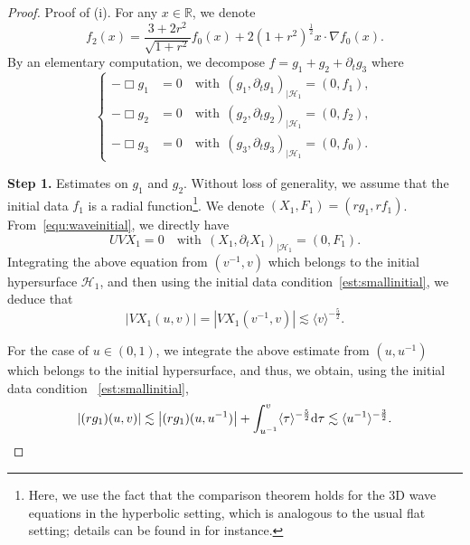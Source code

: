 \documentclass[a4paper,reqno]{amsart}
\theoremstyle{definition}
\numberwithin{equation}{section}
\def \R {{\mathbb{R} }}
\def \d {{\rm{d}}}
\def \pt{\partial_{t}}
\begin{document}
 \begin{proof}
 Proof of (i).
 For any $x\in \R$, we denote 
 \begin{equation*}
     f_{2}(x)=\frac{3+2r^{2}}{\sqrt{1+r^{2}}}f_{0}(x)+2(1+r^{2})^{\frac{1}{2}}x\cdot \nabla f_{0}(x).
 \end{equation*}
  By an elementary computation, we decompose $f=g_{1}+g_{2}+\pt g_{3}$ where
  \begin{equation*}
  \left\{
  \begin{aligned}
      -\Box g_{1}&=0\quad \mbox{with}\ \  (g_{1},\pt g_{1})_{|\mathcal{H}_{1}}=(0,f_{1}),\\
       -\Box g_{2}&=0\quad \mbox{with}\ \  (g_{2},\pt g_{2})_{|\mathcal{H}_{1}}=(0,f_{2}),\\
        -\Box g_{3}&=0\quad \mbox{with}\ \  (g_{3},\pt g_{3})_{|\mathcal{H}_{1}}=(0,f_{0}).
      \end{aligned}
      \right.
  \end{equation*}

  \textbf{Step 1.} Estimates on $g_{1}$ and $g_{2}$.
  Without loss of generality, we assume that the initial data $f_{1}$ is a radial function\footnote{Here, we use the fact that the comparison theorem holds for the 3D wave equations in the hyperbolic setting, which is analogous to the usual flat setting; details can be found in \cite[equations (2.3) and (2.5)]{WaZh25} for instance.}. 
  We denote $(X_{1},F_{1})=(rg_{1},rf_{1})$. From~\eqref{equ:waveinitial}, we directly have 
 \begin{equation*}
     UV X_{1}=0\quad \mbox{with}\ \ (X_{1},\partial_{t}X_{1})_{|\mathcal{H}_{1}}=(0,F_{1}).
 \end{equation*}
 Integrating the above equation from $(v^{-1},v)$ which belongs to the initial hypersurface $\mathcal{H}_{1}$, 
and then using the initial data condition~\eqref{est:smallinitial},  we deduce that 
 \begin{equation}\label{est:VX}
     \left|VX_{1}(u,v)\right|= |VX_{1}(v^{-1},v)|\lesssim \langle v\rangle^{-\frac{5}{2}}.
 \end{equation}

For the case of $u\in (0,1)$, we integrate the above estimate from $(u,u^{-1})$ which belongs to the initial hypersurface, and thus, we obtain, using the initial data condition ~\eqref{est:smallinitial},
\begin{equation*}
    \left|(rg_{1})(u,v)\right|\lesssim 
    \left|(rg_{1})(u,u^{-1})\right|
    +\int_{u^{-1}}^{v}\langle \tau \rangle^{-\frac{5}{2}}\d \tau\lesssim 
    \langle u^{-1}\rangle^{-\frac{3}{2}}.
\end{equation*}



\end{proof}
\end{document}
